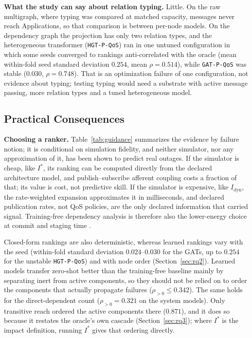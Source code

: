 \noindent\textbf{What the study can say about relation typing.} Little. On the raw multigraph, where typing was compared at matched capacity, messages never reach Applications, so that comparison is between per-node models. On the dependency graph the projection has only two relation types, and the heterogeneous transformer (\texttt{HGT-P-QoS}) ran in one untuned configuration in which some seeds converged to rankings anti-correlated with the oracle (mean within-fold seed standard deviation $0.254$, mean $\rho = 0.514$), while \texttt{GAT-P-QoS} was stable ($0.030$, $\rho = 0.748$). That is an optimization failure of one configuration, not evidence about typing; testing typing would need a substrate with active message passing, more relation types and a tuned heterogeneous model.

\subsection{Practical Consequences}
\label{sec:8.1}

\noindent\textbf{Choosing a ranker.} Table~\ref{tab:guidance} summarizes the evidence by failure notion; it is conditional on simulation fidelity, and neither simulator, nor any approximation of it, has been shown to predict real outages. If the simulator is cheap, like $I^*$, its ranking can be computed directly from the declared architecture model, and publish--subscribe afferent coupling \cite{martin2003agile,rud2006ais} costs a fraction of that; its value is cost, not predictive skill. If the simulator is expensive, like $I_{\text{dyn}}$, the rate-weighted expansion approximates it in milliseconds, and declared publication rates, not QoS policies, are the only declared information that carried signal. Training-free dependency analysis is therefore also the lower-energy choice at commit and staging time \cite{schwartz2020greenai,verdecchia2023greenai}.

Closed-form rankings are also deterministic, whereas learned rankings vary with the seed (within-fold standard deviation $0.024$--$0.030$ for the GATs, up to $0.254$ for the unstable \texttt{HGT-P-QoS}) and with node order (Section~\ref{sec:rq2}). Learned models transfer zero-shot better than the training-free baseline mainly by separating inert from active components, so they should not be relied on to order the components that actually propagate failures ($\rho_{>0} \le 0.342$). The same holds for the direct-dependent count ($\rho_{>0} = 0.321$ on the system models). Only transitive reach ordered the active components there ($0.871$), and it does so because it restates the oracle's own cascade (Section~\ref{sec:rq3}); where $I^*$ is the impact definition, running $I^*$ gives that ordering directly.

